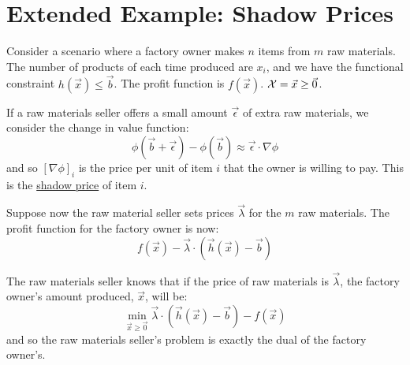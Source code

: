 \documentclass[../Main.tex]{subfiles}
\begin{document}
\section{Extended Example: Shadow Prices}
Consider a scenario where a factory owner makes $n$ items from $m$ raw materials. The number of products of each time produced are $x_i$, and we have the functional constraint $h(\vec{x}) \leq \vec{b}$. The profit function is $f(\vec{x})$. $\mathcal{X} = {\vec{x} \geq \vec0}$.

If a raw materials seller offers a small amount $\vec{\epsilon}$ of extra raw materials, we consider the change in value function:
\begin{equation*}
    \phi(\vec{b} + \vec{\epsilon}) - \phi(\vec{b}) \approx \vec{\epsilon} \cdot \nabla \phi
\end{equation*}
and so $[\nabla \phi]_i$ is the price per unit of item $i$ that the owner is willing to pay. This is the \underline{shadow price} of item $i$.

Suppose now the raw material seller sets prices $\vec{\lambda}$ for the $m$ raw materials. The profit function for the factory owner is now:
\begin{equation*}
    f(\vec{x}) - \vec{\lambda} \cdot (\vec{h}(\vec{x}) - \vec{b})
\end{equation*}

The raw materials seller knows that if the price of raw materials is $\vec{\lambda}$, the factory owner's amount produced, $\vec{x}$, will be:
\begin{equation*}
    \min_{\vec{x} \geq \vec{0}} \vec{\lambda} \cdot (\vec{h}(\vec{x}) - \vec{b}) - f(\vec{x})
\end{equation*}
and so the raw materials seller's problem is exactly the dual of the factory owner's.
\end{document}
